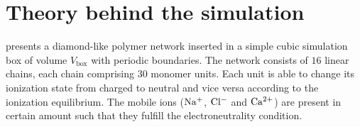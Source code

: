 \documentclass{elsarticle}
\begin{document}
\begin{frontmatter}{}


\title{\mytitle}



    \author[cuni,imc]{Michail Laktionov}
    \author[cuni]{Oleg V. Rud}
    \author[cuni]{Lucie~Nova}
    \author[cuni]{Filip~Uhlik}


    \address[cuni]{Department of Physical and Macromolecular Chemistry, Faculty of Science, Charles University in Prague, Hlavova 8, Praha 2 128 00, Czech Republic}
    \address[imc]{Institute of Macromolecular Compounds of Russian Academy of Sciences, 199004, Bolshoy pr. 31, Saint-Petersburg, Russia}




\begin{abstract}
By this article we model compression of \PE{} hydrogel in equilibrium with small volume of salty aqueous solution.
We show that the the change of the hydrogel volume affects the salinity of the solution. The decrease of the gel volume decreases the solution and vice versa the swelling of the gel increases the surrounding solution. 
This effect can be employed for water desalination ...
\end{abstract}

\end{frontmatter}{}

\section{Theory behind the simulation\label{sec: theory}}

 presents a diamond-like polymer network inserted in a simple cubic simulation box of volume $V_{\mathrm{box}}$ with periodic boundaries.
The network consists of $16$ linear \PE{} chains, each chain comprising $30$ monomer units.
Each unit is able to change its ionization state from charged to neutral and vice versa according to the ionization equilibrium.
The mobile ions ($\mathrm{Na^+}$, $\mathrm{Cl^-}$ and $\mathrm{Ca^{2+}}$) are present in certain amount such that they fulfill the electroneutrality condition.
\end{document}
